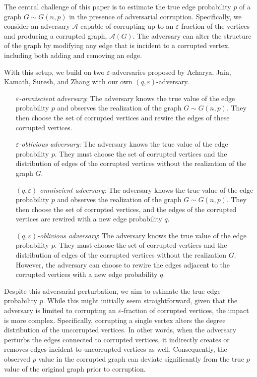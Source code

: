 \documentclass[10pt,onecolumn,letterpaper]{article}
\newcommand{\eps}{\varepsilon}
\begin{document}
The central challenge of this paper is to estimate the true edge probability $p$ of a graph \(G \sim G(n, p)\) in the presence of adversarial corruption. Specifically, we consider an adversary
\(\mathcal{A}\) capable of corrupting up to an $\eps$-fraction of the vertices and producing a corrupted graph, \(\mathcal{A}(G)\). The adversary can alter the structure of the graph by modifying any edge that is incident to a corrupted vertex, including both adding and removing an edge.

With this setup, we build on two $\eps$-adversaries proposed by Acharya, Jain, Kamath, Suresh, and Zhang
\cite{acharya2022robustestimationrandomgraphs} with our own $(q, \eps)$-adversary. 
\begin{enumerate}[align=left]
  \item[\emph{$\eps$-omniscient adversary}:] The adversary knows the true value of the edge probability \(p\) and observes the realization of the graph \(G \sim G(n, p)\). They then choose the set of corrupted vertices and rewire the edges of these corrupted vertices.
  \item[\emph{$\eps$-oblivious adversary}:] The adversary knows the true value of the edge probability \(p\). They must choose the set of corrupted vertices and the distribution of edges of the corrupted vertices without the realization of the graph \(G\).
  \item[\emph{$(q, \eps)$-omniscient adversary}:] The adversary knows the true value of the edge probability \(p\) and observes the realization of the graph $G\sim G(n,p)$. They then choose the set of corrupted vertices, and the edges of the corrupted vertices are rewired with a new edge probability \(q\).
  \item[\emph{$(q, \eps)$-oblivious adversary}:] The adversary knows the true value of the edge probability \(p\). They must choose the set of corrupted vertices and the distribution of edges of the corrupted vertices without the realization \(G\). However, the adversary can choose to rewire the edges adjacent to the corrupted vertices with a new edge probability \(q\).
\end{enumerate}

Despite this adversarial perturbation, we aim to estimate the true edge probability \(p\). While this might initially seem straightforward, given that the adversary is limited to corrupting an $\eps$-fraction of corrupted vertices, the impact is more complex. Specifically, corrupting a single vertex alters the degree distribution of the uncorrupted vertices. In other words, when the adversary perturbs the edges connected to corrupted vertices, it indirectly creates or removes edges incident to uncorrupted vertices as well. Consequently, the observed $p$ value in the corrupted graph can deviate significantly from the true $p$ value of the original graph prior to corruption.
\end{document}
